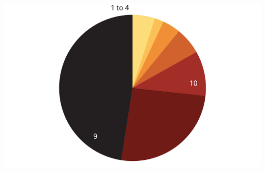 \documentclass[tikz]{standalone}\usepackage[]{graphicx}\usepackage[]{color}
\newenvironment{knitrout}{}{} %
\begin{document}
\begin{knitrout}
\color{fgcolor}
\includegraphics[width=11.000in,height=7.00in]{./Super-tax-targeting/b5-super-atlas/Figure3-7-1} 

\end{knitrout}
\end{document}
